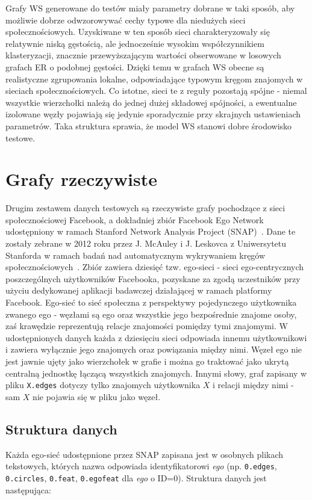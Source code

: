 Grafy WS generowane do testów miały parametry dobrane w taki sposób, aby możliwie dobrze odwzorowywać cechy typowe dla niedużych sieci społecznościowych. Uzyskiwane w ten sposób sieci charakteryzowały się relatywnie niską gęstością, ale jednocześnie wysokim współczynnikiem klasteryzacji, znacznie przewyższającym wartości obserwowane w losowych grafach ER o podobnej gęstości. Dzięki temu w grafach WS obecne są realistyczne zgrupowania lokalne, odpowiadające typowym kręgom znajomych w sieciach społecznościowych. Co istotne, sieci te z reguły pozostają spójne - niemal wszystkie wierzchołki należą do jednej dużej składowej spójności, a ewentualne izolowane węzły pojawiają się jedynie sporadycznie przy skrajnych ustawieniach parametrów. Taka struktura sprawia, że model WS stanowi dobre środowisko testowe.

\section{Grafy rzeczywiste}
Drugim zestawem danych testowych są rzeczywiste grafy pochodzące z sieci społecznościowej Facebook,
a dokładniej zbiór Facebook Ego Network udostępniony w ramach Stanford Network Analysis Project (SNAP)~\cite{snapnets}.
Dane te zostały zebrane w 2012 roku przez J. McAuley i J. Leskovca z Uniwersytetu Stanforda w ramach badań nad automatycznym wykrywaniem kręgów społecznościowych~\cite{McAuley2012}. Zbiór zawiera dziesięć tzw. ego-sieci - sieci ego-centrycznych poszczególnych użytkowników Facebooka, pozyskane za zgodą uczestników przy użyciu dedykowanej aplikacji badawczej działającej w ramach platformy Facebook. Ego-sieć to sieć społeczna z perspektywy pojedynczego użytkownika zwanego ego - węzłami są ego oraz wszystkie jego bezpośrednie znajome osoby, zaś krawędzie reprezentują relacje znajomości pomiędzy tymi znajomymi. W udostępnionych danych każda z dziesięciu sieci odpowiada innemu użytkownikowi i zawiera wyłącznie jego znajomych oraz powiązania między nimi. Węzeł ego nie jest jawnie ujęty jako wierzchołek w grafie i można go traktować jako ukrytą centralną jednostkę łączącą wszystkich znajomych. Innymi słowy, graf zapisany w pliku \verb|X.edges| dotyczy tylko znajomych użytkownika $X$ i relacji między nimi - sam $X$ nie pojawia się w pliku jako węzeł.

\subsection{Struktura danych}

Każda ego-sieć udostępnione przez SNAP zapisana jest w osobnych plikach tekstowych, których nazwa odpowiada identyfikatorowi \textit{ego} (np. \verb|0.edges|, \verb|0.circles|, \verb|0.feat|, \verb|0.egofeat| dla \textit{ego} o ID=0). Struktura danych jest następująca:

